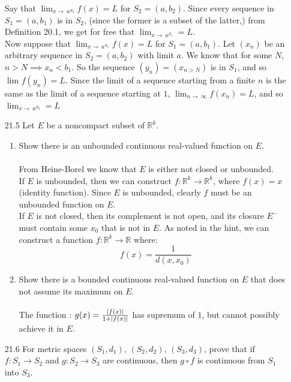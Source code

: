 \begin{enumerate}
    Say that $\lim_{x \to\ a^{S_2}} f(x) = L$ for $S_2 = (a,b_2)$. Since every sequence in $S_1 = (a,b_1)$ is in $S_2$, (since the former is a subset of the latter,) from Definition 20.1, we get for free that $\lim_{x \to\ a^{S_1}} = L$.\\

    Now suppose that $\lim_{x \to\ a^{S_1}} f(x) = L$ for $S_1 = (a,b_1)$. Let $(x_n)$ be an arbitrary sequence in $S_2 = (a,b_2)$ with limit $a$. We know that for some $N$, $n > N \implies x_n < b_1$. So the sequence $(y_n) = (x_{n > N})$ is in $S_1$, and so $\lim_{} f(y_n) = L$. Since the limit of a sequence starting from a finite $n$ is the same as the limit of a sequence starting at $1$, $\lim_{n \to\ \infty} f(x_n) = L$, and so $\lim_{x \to\ a^{S_2}} = L$
  \item [21.5]
    Let $E$ be a noncompact subset of $\mathds{R}^k$.
    \begin{enumerate}
      \item Show there is an unbounded continuous real-valued function on $E$.\\\\

        From Heine-Borel we know that $E$ is either not closed or unbounded.\\

        If $E$ is unbounded, then we can construct $f : \mathds{R}^k \rightarrow \mathds{R}^k$, where $f(x) = x$ (identity function). Since $E$ is unbounded, clearly $f$ must be an unbounded function on $E$.\\

        If $E$ is not closed, then its complement is not open, and its closure $E^{-}$ must contain some $x_0$ that is not in $E$. As noted in the hint, we can construct a function $f : \mathds{R}^k \rightarrow \mathds{R}$ where:
        $$f(x) = \frac{1}{d(x,x_0)}$$
      \item Show there is a bounded continuous real-valued function on $E$ that does not assume its maximum on $E$.\\\\

        The function : $g(x) = \frac{\left\vert f(x) \right\vert}{1 + \left\vert f(x) \right\vert}$ has supremum of $1$, but cannot possibly achieve it in $E$.
    \end{enumerate}
  \item [21.6]
    For metric spaces $(S_1,d_1)$, $(S_2,d_2)$, $(S_3,d_3)$, prove that if $f : S_1 \rightarrow S_2$ and $g : S_2 \rightarrow S_3$ are continuous, then $g \circ f$ is continuous from $S_1$ into $S_3$.\\\\


\end{enumerate}
